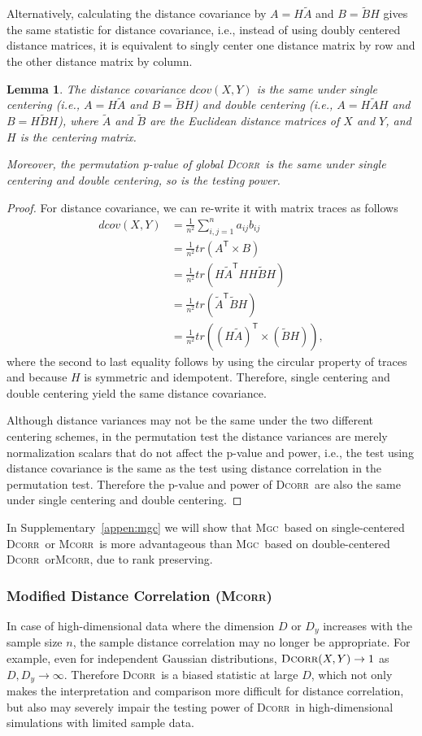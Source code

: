 \documentclass[11pt]{article}
\providecommand{\sct}[1]{{\normalfont\textsc{#1}}}
\newcommand{\T}{^{\ensuremath{\mathsf{T}}}}           %
\newcommand{\Mgc}{\sct{Mgc}}
\newcommand{\Dcorr}{\sct{Dcorr}}
\newcommand{\Mcorr}{\sct{Mcorr}}
\newtheorem{lem}{Lemma}
\begin{document}
Alternatively, calculating the distance covariance by $A=H\tilde{A}$ and $B=\tilde{B}H$ gives the same statistic for distance covariance, i.e., instead of using doubly centered distance matrices, it is equivalent to singly center one distance matrix by row and the other distance matrix by column.
\begin{lem}
The distance covariance $dcov(X,Y)$ is the same under single centering (i.e., $A=H\tilde{A}$ and $B=\tilde{B}H$) and double centering (i.e., $A=H\tilde{A}H$ and $B=H\tilde{B}H$), where $\tilde{A}$ and $\tilde{B}$ are the Euclidean distance matrices of $X$ and $Y$, and $H$ is the centering matrix. 

Moreover, the permutation p-value of global \Dcorr~is the same under single centering and double centering, so is the testing power.
\end{lem}
\begin{proof}
For distance covariance, we can re-write it with matrix traces as follows
\begin{align*}
dcov(X,Y) &= \frac{1}{n^2}\sum_{i,j=1}^{n}a_{ij}b_{ij} \\
 &=\frac{1}{n^2} tr(A\T \times B) \\
 &=\frac{1}{n^2} tr(H\tilde{A}\T HH\tilde{B}H) \\
 &=\frac{1}{n^2} tr(\tilde{A}\T \tilde{B}H) \\
 &=\frac{1}{n^2} tr((H\tilde{A})\T \times (\tilde{B}H)),
\end{align*}
where the second to last equality follows by using the circular property of traces and because $H$ is symmetric and idempotent. Therefore, single centering and double centering yield the same distance covariance.

Although distance variances may not be the same under the two different centering schemes, in the permutation test the distance variances are merely normalization scalars that do not affect the p-value and power, i.e., the test using distance covariance is the same as the test using distance correlation in the permutation test. Therefore the p-value and power of \Dcorr~are also the same under single centering and double centering.
\end{proof}

In Supplementary~\ref{appen:mgc} we will show that \Mgc~based on single-centered \Dcorr~or \Mcorr~is more advantageous than \Mgc~based on double-centered \Dcorr~or\Mcorr, due to rank preserving.

\subsubsection{Modified Distance Correlation (\Mcorr)}
\label{appen:mcorr}
In case of high-dimensional data where the dimension $D$ or $D_y$ increases with the sample size $n$, the sample distance correlation may no longer be appropriate. For example, even for independent Gaussian distributions, $\Dcorr(X,Y) \rightarrow 1$ as $D, D_y \rightarrow \infty$. Therefore \Dcorr~is a biased statistic at large $D$, which not only makes the interpretation and comparison more difficult for distance correlation, but also may severely impair the testing power of \Dcorr~in high-dimensional simulations with limited sample data.
\end{document}
